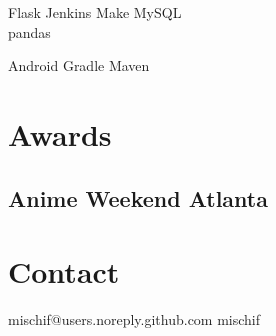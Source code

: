 \documentclass[]{deedy-resume-openfont}
\begin{document}
\begin{minipage}[t]{0.35\textwidth}
Flask \textbullet{} Jenkins \textbullet{} Make \textbullet{} MySQL \\
pandas


Android \textbullet{} Gradle \textbullet{} Maven
\sectionsep


\section{Awards}
\subsection{Anime Weekend Atlanta}
\sectionsep

\section{Contact}
\personal
{mischif@users.noreply.github.com}
{}
{mischif}
{}
{}
{}
\sectionsep

%
%

\end{minipage}
\hfill
\end{document}
